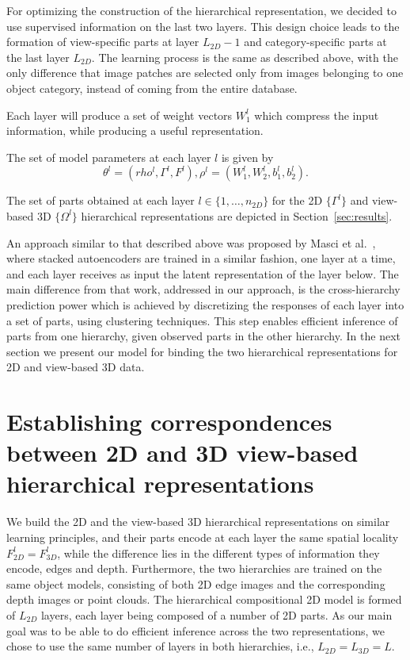 \documentclass[runningheads]{llncs}
\begin{document}
For optimizing the construction of the hierarchical representation, we decided to use supervised information on the last two layers. This design choice leads to the formation of view-specific parts at layer $L_{2D}-1$ and category-specific parts at the last layer $L_{2D}$. The learning process is the same as described above, with the only difference that image patches are selected only from images belonging to one object category, instead of coming from the entire database.    

Each layer will produce a set of weight vectors $W_1^l$ which compress the input information, while producing a useful representation. 

The set of model parameters at each layer $l$ is  given by
\begin{equation}
\theta^l = (rho^l,\Gamma^l,F^l),
\rho^l=(W_1^l,W_2^l,b_1^l,b_2^l).
\end{equation}

The set of parts obtained at each layer $l\in\{1,\ldots,n_{2D}\}$ for the 2D $\{\Gamma^l\}$ and view-based 3D $\{\Omega^l\}$ hierarchical representations are depicted in Section~\ref{sec:results}.

An approach similar to that described above was proposed by Masci et al.~\cite{Masci2011}, where stacked autoencoders are trained in a similar fashion, one layer at a time, and each layer receives as input the latent representation of the layer below. The main difference from that work, addressed in our approach, is the cross-hierarchy prediction power which is achieved by discretizing the responses of each layer into a set of parts, using clustering techniques. This step enables efficient inference of parts from one hierarchy, given observed parts in the other hierarchy. In the next section we present our model for binding the two hierarchical representations for 2D and view-based 3D data.
 
\section{Establishing correspondences between 2D and 3D view-based hierarchical representations}
\label{sec:analysis}

We build the 2D and the view-based 3D hierarchical representations on similar learning principles, and their parts encode at each layer the same spatial locality $F_{2D}^l=F_{3D}^l$, while the difference lies in the different types of information they encode, edges and depth.
Furthermore, the two hierarchies are trained on the same object models, consisting of both 2D edge images and the corresponding depth images or point clouds.  
The hierarchical compositional 2D model is formed of $L_{2D}$ layers, each layer being composed of a number of 2D parts. 
As our main goal was to be able to do efficient inference across the two representations, we chose to use the same number of layers in both hierarchies, i.e., $L_{2D}=L_{3D}=L$.
\end{document}
